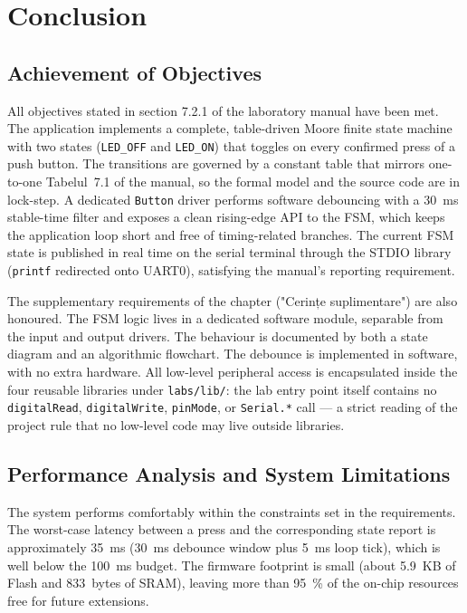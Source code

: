 \section{Conclusion}

\subsection{Achievement of Objectives}

All objectives stated in section 7.2.1 of the laboratory manual have been met. The application implements a complete, table-driven Moore finite state machine with two states (\texttt{LED\_OFF} and \texttt{LED\_ON}) that toggles on every confirmed press of a push button. The transitions are governed by a constant table that mirrors one-to-one Tabelul~7.1 of the manual, so the formal model and the source code are in lock-step. A dedicated \texttt{Button} driver performs software debouncing with a 30~ms stable-time filter and exposes a clean rising-edge API to the FSM, which keeps the application loop short and free of timing-related branches. The current FSM state is published in real time on the serial terminal through the STDIO library (\texttt{printf} redirected onto UART0), satisfying the manual's reporting requirement.

The supplementary requirements of the chapter ("Cerințe suplimentare") are also honoured. The FSM logic lives in a dedicated software module, separable from the input and output drivers. The behaviour is documented by both a state diagram and an algorithmic flowchart. The debounce is implemented in software, with no extra hardware. All low-level peripheral access is encapsulated inside the four reusable libraries under \texttt{labs/lib/}: the lab entry point itself contains no \texttt{digitalRead}, \texttt{digitalWrite}, \texttt{pinMode}, or \texttt{Serial.*} call --- a strict reading of the project rule that no low-level code may live outside libraries.

\subsection{Performance Analysis and System Limitations}

The system performs comfortably within the constraints set in the requirements. The worst-case latency between a press and the corresponding state report is approximately 35~ms (30~ms debounce window plus 5~ms loop tick), which is well below the 100~ms budget. The firmware footprint is small (about 5.9~KB of Flash and 833~bytes of SRAM), leaving more than 95~\% of the on-chip resources free for future extensions.

